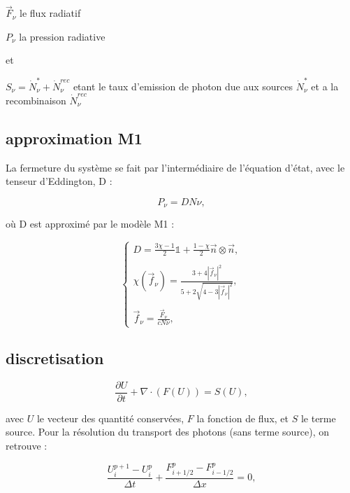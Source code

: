 $\vec{F}_\nu$ le flux radiatif

$P_\nu $ la pression radiative

et 

$S_\nu = \dot{N}_\nu^* + \dot{N}_\nu^{rec}$ etant le taux d'emission de photon due aux sources $\dot{N}_\nu^*$ et a la recombinaison $ \dot{N}_\nu^{rec}$


\subsection{approximation M1}
La fermeture du système se fait par l’intermédiaire de l’équation
d’état, avec le tenseur d’Eddington, D :

\begin{equation}
 P_\nu = D N\nu ,
\label{eq:fermeture}
\end{equation}

où D est approximé par le modèle M1 \citep{levermore1984,gonzalez2005} :

\begin{equation}
\begin{cases}

D = \frac{ 3\chi -1 }{2} \mathbb{1} + \frac{ 1 - \chi }{2} \vec{n} \otimes \vec{n} , \\
\\
\chi(\vec{f}_\nu) = \frac{ 3+4 |\vec{f}_\nu|^2 }{5+2\sqrt{4-3|\vec{f}_\nu|^2}} , \\
\\
\vec{f}_\nu = \frac{ \vec{F}_\nu }{c N\nu }  ,

\end{cases}
\label{eq:tenseur}
\end{equation}

\subsection{discretisation}
\begin{equation}
 \frac{\partial U}{\partial t} + \nabla \cdot (F(U)) = S(U), 
\label{eq:rad_generale}
\end{equation}

avec $U$ le vecteur des quantité conservées, $F$ la fonction de flux, et $S$ le terme source. Pour la résolution du transport des photons (sans terme source), on retrouve :

\begin{equation}
\frac{ U^{p+1}_i - U^{p}_i }{\Delta t} + \frac{ F^{p}_{i
+1/2} - F^{p}_{i-1/2} }{\Delta x} =0,
\label{eq:rad_solver}
\end{equation}

